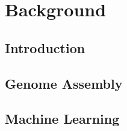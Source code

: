 \chapter{Background} \label{chap:sota}

\section*{}

\section{Introduction}

\section{Genome Assembly}\label{sec:assembly}

\section{Machine Learning}\label{sec:mlearning}
